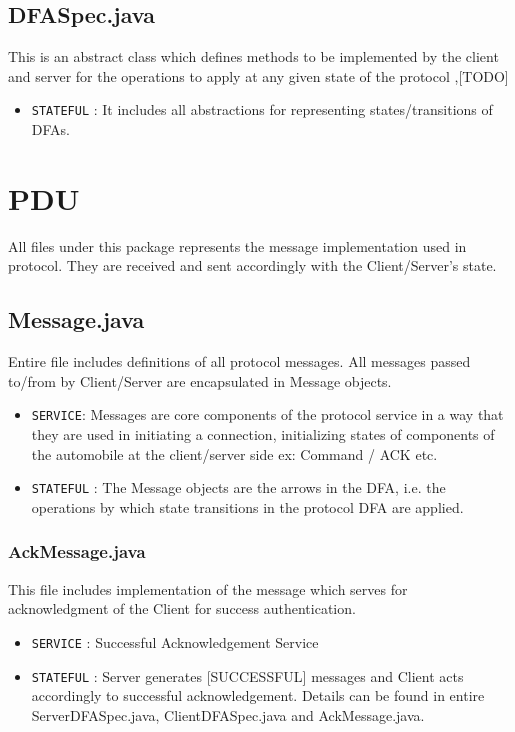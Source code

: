 \documentclass[12pt]{usenixsubmit}
\begin{document}
\subsection{DFASpec.java}This is an abstract class which defines methods to be implemented by the client and server for the operations to apply at any given state of the protocol ,[TODO]
\begin{itemize}
  \item {\tt STATEFUL} : It includes all abstractions for representing states/transitions of DFAs.
\end{itemize}

  \section{PDU} All files under this package represents the message implementation used in protocol. They are received and sent accordingly with the Client/Server's state.

     \subsection{Message.java} Entire file includes definitions of all protocol messages. All messages passed to/from by Client/Server are encapsulated in Message objects.
     \begin{itemize}
     \item {\tt SERVICE}:  Messages are core components of the protocol service in a way that they are used in initiating a connection, initializing states of components of the automobile at the client/server side ex: Command / ACK  etc.
     \item {\tt STATEFUL} : The Message objects are the arrows in the DFA, i.e. the operations by which state transitions in the protocol DFA are applied.
     \end{itemize}
\subsubsection{AckMessage.java} This file includes implementation of the message which serves for acknowledgment of the Client for success authentication.
     \begin{itemize}
     \item {\tt SERVICE} : Successful Acknowledgement Service
     \item {\tt STATEFUL} : Server generates [SUCCESSFUL] messages and Client acts accordingly to successful acknowledgement. Details can be found in entire ServerDFASpec.java, ClientDFASpec.java and AckMessage.java.
     \end{itemize}
\end{document}
